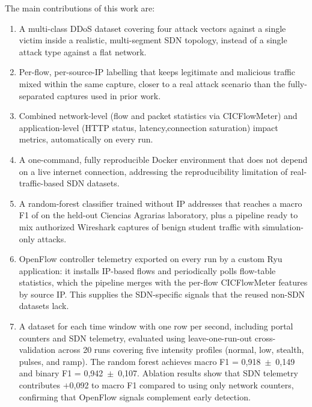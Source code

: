 \documentclass[ASNA,twocolumn]{USG}
\begin{document}
The main contributions of this work are:

\begin{enumerate}[label=\roman*.]
  \item A multi-class DDoS dataset covering four attack vectors
        against a single victim inside a realistic, multi-segment SDN topology, instead of a single attack type against a flat
        network.

  \item Per-flow, per-source-IP labelling that keeps legitimate and
        malicious traffic mixed within the same capture, closer to a real attack scenario than the fully-separated captures used in prior work.

  \item Combined network-level (flow and packet statistics via
        CICFlowMeter) and application-level (HTTP status, latency,connection saturation) impact metrics, automatically on every run.

  \item A one-command, fully reproducible Docker environment that
        does not depend on a live internet connection, addressing the reproducibility limitation of real-traffic-based SDN datasets.

  \item A random-forest classifier trained without IP addresses that
        reaches a macro F1 of \Fmacro on the held-out Ciencias Agrarias laboratory, plus a pipeline ready to mix authorized Wireshark captures of benign student traffic with simulation-only attacks.

  \item OpenFlow controller telemetry exported on every run by a custom Ryu application: it installs IP-based flows and periodically polls flow-table statistics, which the pipeline merges with the per-flow CICFlowMeter features by source IP. This supplies the SDN-specific signals that the reused non-SDN datasets lack.
  
  \item A dataset for each time window with one row per second, including portal counters and SDN telemetry, evaluated using leave-one-run-out cross-validation across 20 runs covering five intensity profiles (normal, low, stealth, pulses, and ramp). The random forest achieves macro F1 = 0{,}918~$\pm$~0{,}149 and binary F1 = 0{,}942~$\pm$~0{,}107. Ablation results show that SDN telemetry contributes $+$0{,}092 to macro F1 compared to using only network counters, confirming that OpenFlow signals complement early detection.

\end{enumerate}
\end{document}
